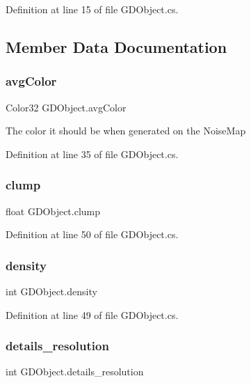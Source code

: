 Definition at line 15 of file G\+D\+Object.\+cs.



\subsection{Member Data Documentation}
\mbox{\label{class_g_d_object_a1ed8916b1058611971474046e8894ebc}} 
\subsubsection{avg\+Color}
{\footnotesize\ttfamily Color32 G\+D\+Object.\+avg\+Color}



The color it should be when generated on the Noise\+Map 



Definition at line 35 of file G\+D\+Object.\+cs.

\mbox{\label{class_g_d_object_a30d5f7a0b35dbfa74cb96eafa5665a1a}} 
\subsubsection{clump}
{\footnotesize\ttfamily float G\+D\+Object.\+clump}



Definition at line 50 of file G\+D\+Object.\+cs.

\mbox{\label{class_g_d_object_a7fff8f2afda3f8d72bc917e9337d3633}} 
\subsubsection{density}
{\footnotesize\ttfamily int G\+D\+Object.\+density}



Definition at line 49 of file G\+D\+Object.\+cs.

\mbox{\label{class_g_d_object_a461d4e3d561938f0b63a9cf4ad9e4226}} 
\subsubsection{details\+\_\+resolution}
{\footnotesize\ttfamily int G\+D\+Object.\+details\+\_\+resolution}



